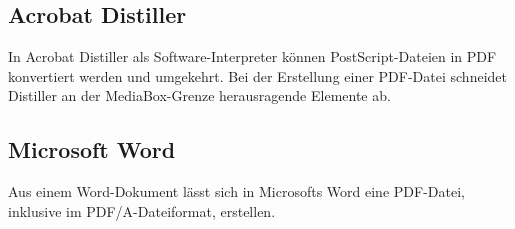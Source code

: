 \subsection{Acrobat Distiller}
In Acrobat Distiller als Software-Interpreter können PostScript-Dateien in PDF konvertiert werden und umgekehrt. Bei der Erstellung einer PDF-Datei schneidet Distiller an der MediaBox-Grenze herausragende Elemente ab. \cite{schneeberger}

\subsection{Microsoft Word}
Aus einem Word-Dokument lässt sich in Microsofts Word eine PDF-Datei, inklusive im PDF/A-Dateiformat, erstellen. \cite{adobe-pdf-a}
